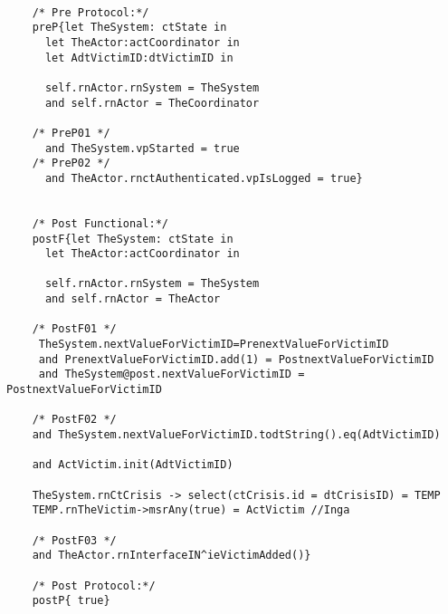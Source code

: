 	\scriptsize
	\vspace{0.5cm}
	\begin{lstlisting}[style=MessirStyle,firstnumber=auto,captionpos=b,caption={\msrmessir (MCL-oriented) specification of the operation \emph{oeAddVictim}.},label=OM-actCoordinator-oeAddVictim-MCL-LST]

	/* Pre Protocol:*/ 
	preP{let TheSystem: ctState in
	  let TheActor:actCoordinator in
	  let AdtVictimID:dtVictimID in
	  
	  self.rnActor.rnSystem = TheSystem
	  and self.rnActor = TheCoordinator
	  
	/* PreP01 */
	  and TheSystem.vpStarted = true
	/* PreP02 */
	  and TheActor.rnctAuthenticated.vpIsLogged = true}
	
	
	/* Post Functional:*/ 
	postF{let TheSystem: ctState in
	  let TheActor:actCoordinator in
	  
	  self.rnActor.rnSystem = TheSystem
	  and self.rnActor = TheActor
	  
	/* PostF01 */
	 TheSystem.nextValueForVictimID=PrenextValueForVictimID
	 and PrenextValueForVictimID.add(1) = PostnextValueForVictimID
	 and TheSystem@post.nextValueForVictimID = PostnextValueForVictimID
	
	/* PostF02 */
	and TheSystem.nextValueForVictimID.todtString().eq(AdtVictimID)
	
	and ActVictim.init(AdtVictimID)
					   
	TheSystem.rnCtCrisis -> select(ctCrisis.id = dtCrisisID) = TEMP
	TEMP.rnTheVictim->msrAny(true) = ActVictim //Inga
	
	/* PostF03 */
	and TheActor.rnInterfaceIN^ieVictimAdded()}
	
	/* Post Protocol:*/ 
	postP{ true}
	
	\end{lstlisting}
	\normalsize 
	
	
	
	





